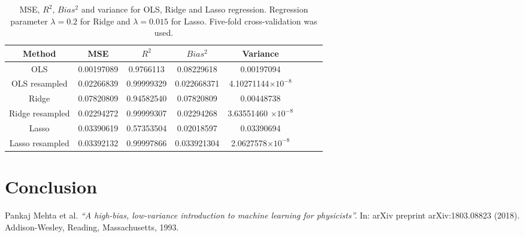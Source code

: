 \documentclass[10pt]{article}
\begin{document}
\begin{table}
	\begin{tabular}{ |c|c|c|c|c|c|c|c|} 
		\hline
		Method & MSE  & $R^2$ & $Bias^2$ & Variance    \\
		\hline 
		\hline  
		OLS & 0.00197089  & 0.9766113 & 0.08229618 & 0.00197094  \\
		\hline  
		OLS resampled & 0.02266839  & 0.99999329 & 0.022668371 & 4.10271144$\times 10^{-8}$  \\
		\hline
		Ridge & 0.07820809  &0.94582540& 0.07820809 &  0.00448738   \\ 
				\hline
		Ridge resampled & 0.02294272  & 0.99999307 & 0.02294268 & 3.63551460 $\times 10^{-8}$    \\ 
		\hline
		Lasso & 0.03390619  & 0.57353504 & 0.02018597 & 0.03390694    \\ 
		\hline
		Lasso resampled & 0.03392132  & 0.99997866 & 0.033921304 & 2.0627578$\times 10^{-8}$    \\ 
		\hline
	\end{tabular}
	\caption{MSE, $R^2$, $Bias^2$ and variance for OLS, Ridge and Lasso regression. Regression parameter $\lambda=0.2$ for Ridge and  $\lambda=0.015$  for Lasso. Five-fold cross-validation was used.}
\end{table}









\section{Conclusion}\label{Conclusion}


\begin{thebibliography}{9}
	Pankaj Mehta et al. 
	\textit{ “A high-bias, low-variance introduction to machine learning for physicists”.}
	 In: arXiv preprint arXiv:1803.08823 (2018). Addison-Wesley, Reading, Massachusetts, 1993.
\end{thebibliography}
\end{document}

